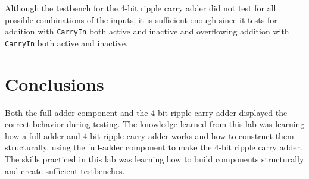 \documentclass[11pt]{report}
\begin{document}
Although the testbench for the 4-bit ripple carry adder did not test for all possible combinations
of the inputs, it is sufficient enough since it tests for addition with \verb|CarryIn| both active
and inactive and overflowing addition with \verb|CarryIn| both active and inactive.

\section*{Conclusions}
Both the full-adder component and the 4-bit ripple carry adder displayed the correct behavior during
testing. The knowledge learned from this lab was learning how a full-adder and 4-bit ripple carry
adder works and how to construct them structurally, using the full-adder component to make the 4-bit
ripple carry adder. The skills practiced in this lab was learning how to build components
structurally and create sufficient testbenches.

% 
% 
% 
% 
% 
% 
\end{document}
